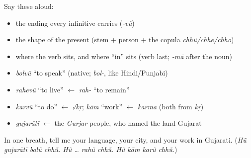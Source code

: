 \begin{grammarlens}[title={Grammar lens — the engine}]
Say these aloud:

\begin{itemize}
\raggedright
  \item the ending every infinitive carries (\emph{-vũ})
  \item the shape of the present (stem + person + the copula \emph{chhũ/chhe/chho})
  \item where the verb sits, and where \textquotedblleft{}in\textquotedblright{} sits (verb last; \emph{-mā} after the noun)
\end{itemize}
\end{grammarlens}

\begin{grammarlens}[title={What you've built — roots you now carry}]
\begin{itemize}
\raggedright
  \item \emph{bolvũ} \textquotedblleft{}to speak\textquotedblright{} (native; \emph{bol-}, like Hindi/Punjabi)
  \item \emph{rahevũ} \textquotedblleft{}to live\textquotedblright{} $\leftarrow$ \emph{rah-} \textquotedblleft{}to remain\textquotedblright{}
  \item \emph{karvũ} \textquotedblleft{}to do\textquotedblright{} $\leftarrow$ \emph{√kṛ}; \emph{kām} \textquotedblleft{}work\textquotedblright{} $\leftarrow$ \emph{karma} (both from \emph{kṛ})
  \item \emph{gujarātī} $\leftarrow$ the \emph{Gurjar} people, who named the land Gujarat
\end{itemize}
\end{grammarlens}

\begin{tcolorbox}[breakable,colback=teal!4,colframe=teal!35!black,title={Before you move on}]
In one breath, tell me your language, your city, and your work in Gujarati. (\emph{Hũ gujarātī bolũ chhũ. Hũ … rahũ chhũ. Hũ kām karũ chhũ.})
\end{tcolorbox}
